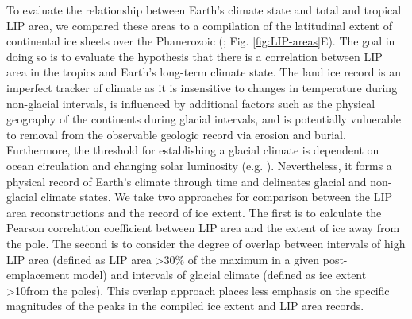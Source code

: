 To evaluate the relationship between Earth's climate state and total and tropical LIP area, we compared these areas to a compilation of the latitudinal extent of continental ice sheets over the Phanerozoic (\citealp{Macdonald2019a}; Fig. \ref{fig:LIP-areas}E). The goal in doing so is to evaluate the hypothesis that there is a correlation between LIP area in the tropics and Earth's long-term climate state. The land ice record is an imperfect tracker of climate as it is insensitive to changes in temperature during non-glacial intervals, is influenced by additional factors such as the physical geography of the continents during glacial intervals, and is potentially vulnerable to removal from the observable geologic record via erosion and burial. Furthermore, the threshold \pCOtwo for establishing a glacial climate is dependent on ocean circulation and changing solar luminosity (e.g. \citealp{Shevenell2004a, DeConto2008a}). Nevertheless, it forms a physical record of Earth's climate through time and delineates glacial and non-glacial climate states. We take two approaches for comparison between the LIP area reconstructions and the record of ice extent. The first is to calculate the Pearson correlation coefficient between LIP area and the extent of ice away from the pole. The second is to consider the degree of overlap between intervals of high LIP area (defined as LIP area \textgreater30\% of the maximum in a given post-emplacement model) and intervals of glacial climate (defined as ice extent \textgreater10\degrees from the poles). This overlap approach places less emphasis on the specific magnitudes of the peaks in the compiled ice extent and LIP area records.

